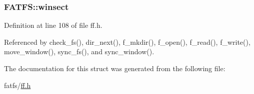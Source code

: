 \hypertarget{structFATFS_ac60e69c00e6bf7c25febfbac4dc1476b}{
\subsubsection[{winsect}]{ F\-A\-T\-F\-S\-::winsect}}\label{structFATFS_ac60e69c00e6bf7c25febfbac4dc1476b}


Definition at line 108 of file ff.\-h.



Referenced by check\-\_\-fs(), dir\-\_\-next(), f\-\_\-mkdir(), f\-\_\-open(), f\-\_\-read(), f\-\_\-write(), move\-\_\-window(), sync\-\_\-fs(), and sync\-\_\-window().



The documentation for this struct was generated from the following file\-:\begin{DoxyCompactItemize}
\item 
fatfs/\hyperlink{ff_8h}{ff.\-h}\end{DoxyCompactItemize}
